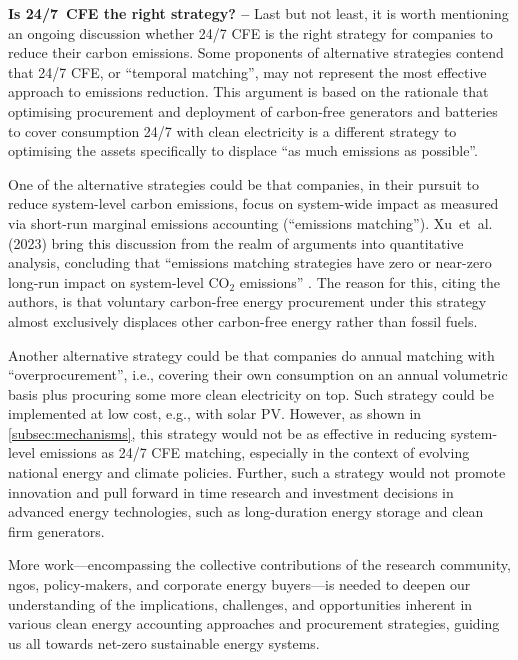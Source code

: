 \documentclass[11pt, 5p, nopreprintline]{elsarticle}
\begin{document}
\textbf{Is 24/7~CFE the right strategy? --} Last but not least, it is worth mentioning an ongoing discussion whether 24/7 CFE is the right strategy for companies to reduce their carbon emissions.
Some proponents of alternative strategies contend that 24/7 CFE, or \enquote{temporal matching}, may not represent the most effective approach to emissions reduction.
This argument is based on the rationale that optimising procurement and deployment of carbon-free generators and batteries to cover consumption 24/7 with clean electricity is a different strategy to optimising the assets specifically to displace \enquote{as much emissions as possible}.

One of the alternative strategies could be that companies, in their pursuit to reduce system-level carbon emissions, focus on system-wide impact as measured via short-run marginal emissions accounting (\enquote{emissions matching}).
Xu~et~al. (2023) bring this discussion from the realm of arguments into quantitative analysis, concluding that \enquote{emissions matching strategies have zero or near-zero long-run impact on system-level CO$_2$ emissions} \cite{princeton-247CFEvsEmissionality}. The reason for this, citing the authors, is that voluntary carbon-free energy procurement under this strategy almost exclusively displaces other carbon-free energy rather than fossil fuels.

Another alternative strategy could be that companies do annual matching with \enquote{overprocurement}, i.e., covering their own consumption on an annual volumetric basis plus procuring some more clean electricity on top. Such strategy could be implemented at low cost, e.g., with solar PV.
However, as shown in \cref{subsec:mechanisms}, this strategy would not be as effective in reducing system-level emissions as 24/7 CFE matching, especially in the context of evolving national energy and climate policies.
Further, such a strategy would not promote innovation and pull forward in time research and investment decisions in advanced energy technologies, such as long-duration energy storage and clean firm generators.

More work---encompassing the collective contributions of the research community, \gls{ngo}s, policy-makers, and corporate energy buyers---is needed to deepen our understanding of the implications, challenges, and opportunities inherent in various clean energy accounting approaches and procurement strategies, guiding us all towards net-zero sustainable energy systems.
\end{document}
